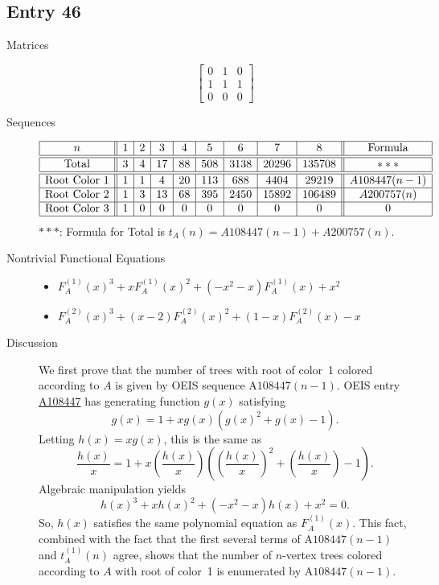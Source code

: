 \documentclass[12pt]{amsart}
\newcommand{\seqnum}[1]{\href{https://oeis.org/#1}{#1}}
\newcommand{\gff}[2]{F_{#2}^{(#1)}(x)}
\newcommand{\gfa}[1]{\gff{#1}{A}}
\begin{document}
\subsection*{Entry 46}
\begin{description}
    \item[Matrices]
    
    \[\begin{bmatrix}
0 & 1 & 0 \\
1 & 1 & 1 \\
0 & 0 & 0
\end{bmatrix}\]
    \item[Sequences]\hspace*{\fill}\vspace{-0.5cm}
    \begin{center}
        \[
        \begin{array}{|c||c|c|c|c|c|c|c|c||c|}\hline
           n  & 1 & 2 & 3 & 4 & 5 & 6 & 7 & 8  & \text{Formula}\\\hline\hline
           \text{Total}  & 3 & 4 & 17 & 88 & 508 & 3138 & 20296 & 135708 & ***\\\hline\hline
           \text{Root Color }1 & 1 & 1 & 4 & 20 & 113 & 688 & 4404 & 29219 & A108447(n-1)\\\hline
           \text{Root Color }2 & 1 & 3 & 13 & 68 & 395 & 2450 & 15892 & 106489 & A200757(n)\\\hline
           \text{Root Color }3 & 1 & 0 & 0 & 0 & 0 & 0 & 0 & 0 & 0\\\hline
        \end{array}
        \]
        $***$: Formula for Total is $t_A(n)=A108447(n-1)+A200757(n)$.
    \end{center}
    
    
    \item[Nontrivial Functional Equations]\hspace*{\fill}

    \begin{itemize}
\item $\gfa{1}^3+x\gfa{1}^2+(-x^2 - x)\gfa{1}+x^2$

\item $\gfa{2}^3+(x - 2)\gfa{2}^2+(1 - x)\gfa{2}-x$


\end{itemize}
    \item[Discussion] We first prove that the number of trees with root of color~1 colored according to $A$ is given by OEIS sequence $\text{A108447}(n-1)$.
    OEIS entry \seqnum{A108447} has generating function $g(x)$ satisfying
    \[
    g(x) = 1 + xg(x)(g(x)^2+g(x)-1).
    \]
    Letting $h(x)=xg(x)$, this is the same as
    \[
    \frac{h(x)}{x} = 1 + x\left(\frac{h(x)}{x}\right)\left(\left(\frac{h(x)}{x}\right)^2+\left(\frac{h(x)}{x}\right)-1\right).
    \]
    Algebraic manipulation yields
    \[
    h(x)^3+xh(x)^2+(-x^2-x)h(x)+x^2=0.
    \]
    So, $h(x)$ satisfies the same polynomial equation as $\gfa{1}$. This fact, combined with the fact that the first several terms of $\text{A108447}(n-1)$ and $t_A^{(1)}(n)$ agree, shows that the number of $n$-vertex trees colored according to $A$ with root of color~1 is enumerated by $\text{A108447}(n-1)$.


\end{description}
\end{document}
